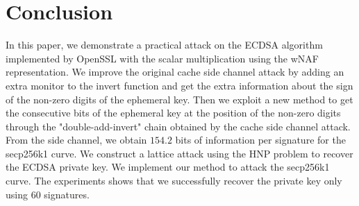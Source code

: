 \section{Conclusion}
\label{sec:conclusion}
In this paper, we demonstrate a practical attack on the ECDSA algorithm implemented by OpenSSL with the scalar multiplication using the wNAF representation.
We improve the original cache side channel attack by adding an extra monitor to the invert function and get the extra information about the sign of the non-zero digits of the ephemeral key.
Then we exploit a new method to get the consecutive bits of the ephemeral key at the position of the non-zero digits through the "double-add-invert" chain obtained by the cache side channel attack.
From the side channel, we obtain $154.2$ bits of information per signature for the secp256k1 curve.
We construct a lattice attack using the HNP problem to recover the ECDSA private key.
We implement our method to attack the secp256k1 curve.
The experiments shows that we successfully recover the private key only using $60$ signatures.






